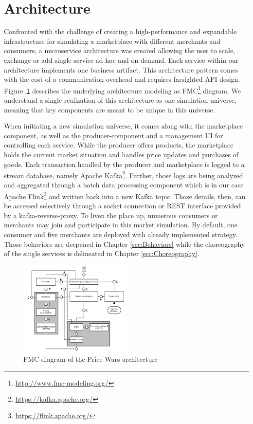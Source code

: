 \section{Architecture}
\label{sec:Architecture}
%
Confronted with the challenge of creating a high-performance and expandable infrastructure for simulating a marketplace with different merchants and consumers, a microservice architecture was created allowing the user to scale, exchange or add single service ad-hoc and on demand. Each service within our architecture implements one business artifact. This architecture pattern comes with the cost of a communication overhead and requires farsighted API design.\\

Figure~\ref{fig:fmc} describes the underlying architecture modeling as FMC\footnote{\url{http://www.fmc-modeling.org/}} diagram. We understand a single realization of this architecture as one simulation universe, meaning that key components are meant to be unique in this universe. 

When initiating a new simulation universe, it comes along with the marketplace component, as well as the producer-component and a management UI for controlling each service. While the producer offers products, the marketplace holds the current market situation and handles price updates and purchases of goods. Each transaction handled by the producer and marketplace is logged to a stream database, namely Apache Kafka\footnote{\url{https://kafka.apache.org/}}. Further, those logs are being analyzed and aggregated through a batch data processing component which is in our case Apache Flink\footnote{\url{https://flink.apache.org/}} and written back into a new Kafka topic. Those details, then, can be accessed selectively through a socket connection or REST interface provided by a kafka-reverse-proxy. 
To liven the place up, numerous consumers or merchants may join and participate in this market simulation. By default, one consumer and five merchants are deployed with already implemented strategy. Those behaviors are deepened in Chapter \ref{sec:Behaviors} while the choreography of the single services is delineated in Chapter \ref{sec:Choreography}.

%
\begin{figure}[h]
    \centering
    \includegraphics[width=0.5\textwidth]{images/architecture_fmc.png}
    \caption{FMC diagram of the Price Wars architecture}
    \label{fig:fmc}
\end{figure}
%
